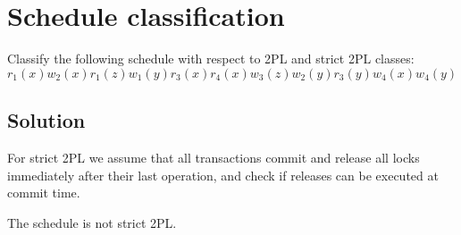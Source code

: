 \documentclass[12pt, a4paper]{report}
\newtheorem[style=M,bodystyle=\normalfont]{theorem}{Theorem}
\newtheorem[style=M,bodystyle=\normalfont]{corollary}{Corollary}
\newtheorem[style=M,bodystyle=\normalfont]{lemma}{Lemma}
\newtheorem[style=M,bodystyle=\normalfont]{definition}{Definition}
\begin{document}
    \newpage

    \section{Schedule classification}
        Classify the following schedule with respect to 2PL and strict 2PL classes: 
        \[r_1(x) w_2(x) r_1(z) w_1(y) r_3(x) r_4(x) w_3(z) w_2(y) r_3(y) w_4(x) w_4(y)\]
    \subsection*{Solution}
        For strict 2PL we assume that all transactions commit and release all locks immediately after their last operation, and check if releases can be executed at commit time.
        \begin{table}[H]
            \centering
        \end{table}
        The schedule is not strict 2PL.
\end{document}
